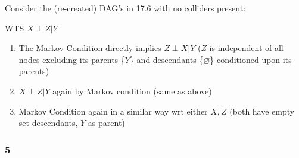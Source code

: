 \documentclass[11pt]{article}
\begin{document}
Consider the (re-created) DAG's in 17.6 with no colliders present: 

\begin{figure}[h]
\centering 
{}
\end{figure}

\begin{figure}[h]
\centering 
{}
\end{figure}

\begin{figure}[h]
\centering 
{}
\end{figure}

WTS $X \perp Z|Y$

\begin{enumerate}
    \item The Markov Condition directly implies $Z \perp X | Y$ ($Z$ is independent of all nodes excluding its parents \{$Y$\} and descendants \{$\varnothing$\} conditioned upon its parents)
    \item $X \perp Z |Y$ again by Markov condition (same as above)
    \item Markov Condition again in a similar way wrt either $X,Z$ (both have empty set descendants, $Y$ as parent) 
\end{enumerate}

\subsubsection*{5}

\begin{figure}[H]
\centering 
{}
\end{figure}
\end{document}
